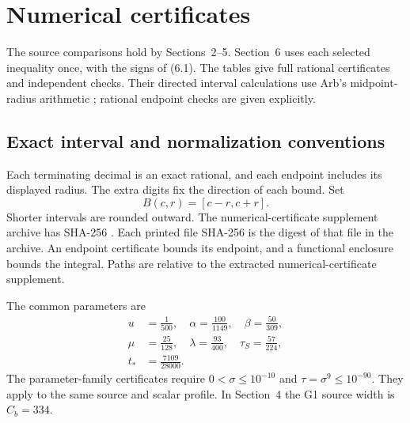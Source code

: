 {
\def\UrlBreaks{\do a\do b\do c\do d\do e\do f\do g\do h\do i\do j\do k\do l\do m\do n\do o\do p\do q\do r\do s\do t\do u\do v\do w\do x\do y\do z\do A\do B\do C\do D\do E\do F\do G\do H\do I\do J\do K\do L\do M\do N\do O\do P\do Q\do R\do S\do T\do U\do V\do W\do X\do Y\do Z\do 0\do 1\do 2\do 3\do 4\do 5\do 6\do 7\do 8\do 9\do /\do _\do .\do -}
\newcommand{\CertificateInterval}[2]{\left[\begin{gathered}{}#1,\\{}#2\end{gathered}\right]}
\section{Numerical certificates}

The source comparisons hold by Sections~2--5.
Section~6 uses each selected inequality once,
with the signs of (6.1).
The tables give full rational certificates and independent checks.
Their directed interval calculations use Arb's midpoint-radius arithmetic
\cite{Johansson2017}; rational endpoint checks are given explicitly.

\subsection{Exact interval and normalization conventions}

Each terminating decimal is an exact rational,
and each endpoint includes its displayed radius.
The extra digits fix the direction of each bound.
Set
\[
 B(c,r)=[c-r,c+r].                                      \tag{A.1}
\]
Shorter intervals are rounded outward.
The numerical-certificate supplement archive  has SHA-256
.
Each printed file SHA-256 is the digest of that file in the archive.
An endpoint certificate bounds its endpoint,
and a functional enclosure bounds the integral.
Paths are relative to the extracted numerical-certificate supplement.

The common parameters are
\[
\begin{aligned}
 u&=\frac1{500},\quad \alpha=\frac{100}{1149},\quad
 \beta=\frac{50}{309},\\
 \mu&=\frac{25}{128},\quad \lambda=\frac{93}{400},\quad
 \tau_S=\frac{57}{224},\\
 t_*&=\frac{7109}{28000}.
\end{aligned}\tag{A.2}
\]
The parameter-family certificates require
$0<\sigma\le10^{-10}$ and $\tau=\sigma^9\le10^{-90}$.
They apply to the same source and scalar profile.
In Section~4 the G1 source width is $C_b=334$.

}
